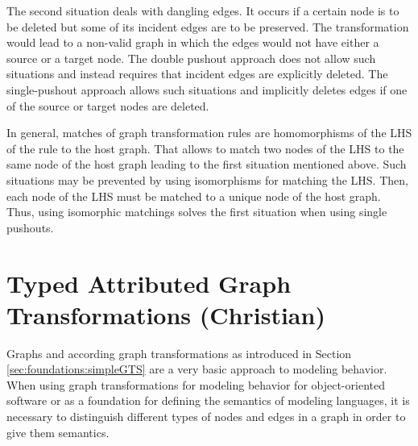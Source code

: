The second situation deals with dangling edges. It occurs if a certain node is
to be deleted but some of its incident edges are to be preserved. The
transformation would lead to a non-valid graph in which the edges would not have
either a source or a target node. The double pushout approach does not allow
such situations and instead requires that incident edges are explicitly
deleted. The single-pushout approach allows such situations and implicitly
deletes edges if one of the source or target nodes are deleted.

In general, matches of graph transformation rules are homomorphisms of the LHS of the rule to the host graph. That allows to match two nodes of the LHS to the same node of the host graph leading to the first situation mentioned above. Such situations may be prevented by using isomorphisms for matching the LHS. Then, each node of the LHS must be matched to a unique node of the host graph. Thus, using isomorphic matchings solves the first situation when using single pushouts.

\section{Typed Attributed Graph Transformations (Christian)}
\label{sec:foundations:typedAttrGTS}

Graphs and according graph transformations as introduced in Section \ref{sec:foundations:simpleGTS} are a very basic approach to modeling behavior. When using graph transformations for modeling behavior for object-oriented software or as a foundation for defining the semantics of modeling languages, it is necessary to distinguish different types of nodes and edges in a graph in order to give them semantics.

